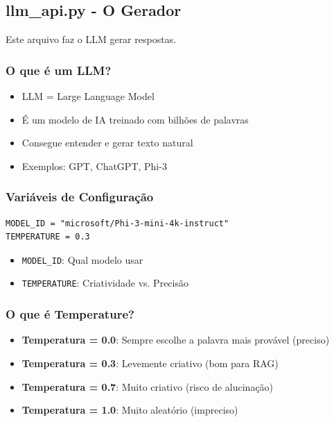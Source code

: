 \documentclass[12pt,a4paper]{article}
\begin{document}
\subsection{llm\_api.py - O Gerador}

Este arquivo faz o LLM gerar respostas.

\subsubsection{O que é um LLM?}

\begin{itemize}
    \item LLM = Large Language Model
    \item É um modelo de IA treinado com bilhões de palavras
    \item Consegue entender e gerar texto natural
    \item Exemplos: GPT, ChatGPT, Phi-3
\end{itemize}

\subsubsection{Variáveis de Configuração}

\begin{lstlisting}
MODEL_ID = "microsoft/Phi-3-mini-4k-instruct"
TEMPERATURE = 0.3
\end{lstlisting}

\begin{itemize}
    \item \texttt{MODEL\_ID}: Qual modelo usar
    \item \texttt{TEMPERATURE}: Criatividade vs. Precisão
\end{itemize}

\subsubsection{O que é Temperature?}

\begin{itemize}
    \item \textbf{Temperatura = 0.0}: Sempre escolhe a palavra mais provável (preciso)
    \item \textbf{Temperatura = 0.3}: Levemente criativo (bom para RAG)
    \item \textbf{Temperatura = 0.7}: Muito criativo (risco de alucinação)
    \item \textbf{Temperatura = 1.0}: Muito aleatório (impreciso)
\end{itemize}
\end{document}
